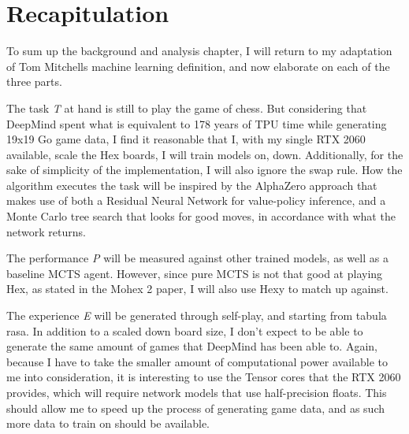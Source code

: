 \section{Recapitulation}
To sum up the background and analysis chapter, I will return to my adaptation of Tom Mitchells machine learning definition, and now elaborate on each of the three parts.

The task \textit{T} at hand is still to play the game of chess. But considering that DeepMind spent what is equivalent to 178 years of TPU time while generating 19x19 Go game data, I find it reasonable that I, with my single RTX 2060 available, scale the Hex boards, I will train models on, down. Additionally, for the sake of simplicity of the implementation, I will also ignore the swap rule. How the algorithm executes the task will be inspired by the AlphaZero approach that makes use of both a Residual Neural Network for value-policy inference, and a Monte Carlo tree search that looks for good moves, in accordance with what the network returns.

The performance \textit{P} will be measured against other trained models, as well as a baseline MCTS agent. However, since pure MCTS is not that good at playing Hex, as stated in the Mohex 2 paper\cite{Huang2014}, I will also use Hexy to match up against.

The experience \textit{E} will be generated through self-play, and starting from tabula rasa. In addition to a scaled down board size, I don't expect to be able to generate the same amount of games that DeepMind has been able to. Again, because I have to take the smaller amount of computational power available to me into consideration, it is interesting to use the Tensor cores that the RTX 2060 provides, which will require network models that use half-precision floats. This should allow me to speed up the process of generating game data, and as such more data to train on should be available.